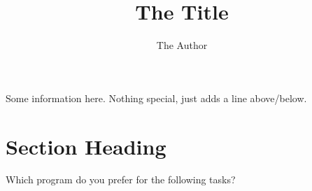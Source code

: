 \documentclass[draft,english,pdf,pagemark,stamp]{sdaps}
\author{The Author}
\title{The Title}
\begin{document}
  \begin{questionnaire}
    \begin{info}
      Some information here. Nothing special, just adds a line above/below.
    \end{info}

    \section{Section Heading}
        \begin{choicegroup}{Which program do you prefer for the following tasks?}

        \end{choicegroup}




  \end{questionnaire}
\end{document}
